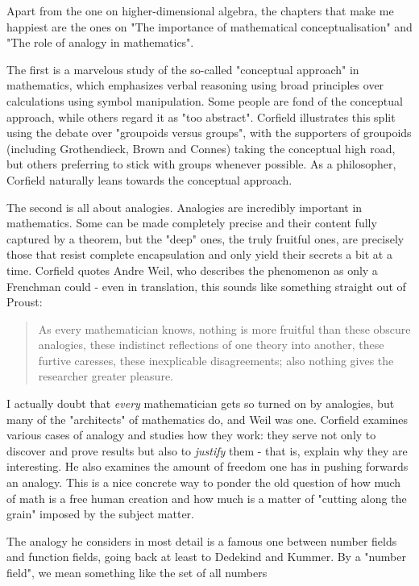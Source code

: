 Apart from the one on higher-dimensional algebra, the chapters
that make me happiest are the ones on "The importance of 
mathematical conceptualisation" and "The role of analogy in
mathematics".   

The first is a marvelous study of the so-called "conceptual 
approach" in mathematics, which emphasizes verbal reasoning using 
broad principles over calculations using symbol manipulation.
Some people are fond of the conceptual approach, while others 
regard it as "too abstract".  Corfield illustrates this split
using the debate over "groupoids versus groups", with the supporters 
of groupoids (including Grothendieck, Brown and Connes) taking 
the conceptual high road, but others preferring to stick with
groups whenever possible.  As a philosopher, Corfield naturally
leans towards the conceptual approach.

The second is all about analogies.  Analogies are incredibly 
important in mathematics.   Some can be made completely precise 
and their content fully captured by a theorem, but the "deep" 
ones, the truly fruitful ones, are precisely those that resist 
complete encapsulation and only yield their secrets a bit at a 
time.  Corfield quotes Andre Weil, who describes the phenomenon 
as only a Frenchman could - even in translation, this sounds like 
something straight out of Proust:

\begin{quote}
     As every mathematician knows, nothing is more fruitful
     than these obscure analogies, these indistinct reflections
     of one theory into another, these furtive caresses, these 
     inexplicable disagreements; also nothing gives the researcher 
     greater pleasure.
\end{quote}
    
I actually doubt that \emph{every} mathematician gets so turned on by 
analogies, but many of the "architects" of mathematics do, and 
Weil was one.  Corfield examines various cases of analogy and 
studies how they work: they serve not only to discover and 
prove results but also to \emph{justify} them - that is, explain why 
they are interesting.  He also examines the amount of freedom 
one has in pushing forwards an analogy.  This is a nice concrete
way to ponder the old question of how much of math is a free
human creation and how much is a matter of "cutting along the 
grain" imposed by the subject matter.  

The analogy he considers in most detail is a famous one between 
number fields and function fields, going back at least to Dedekind 
and Kummer.  By a "number field", we mean something like the set 
of all numbers 

